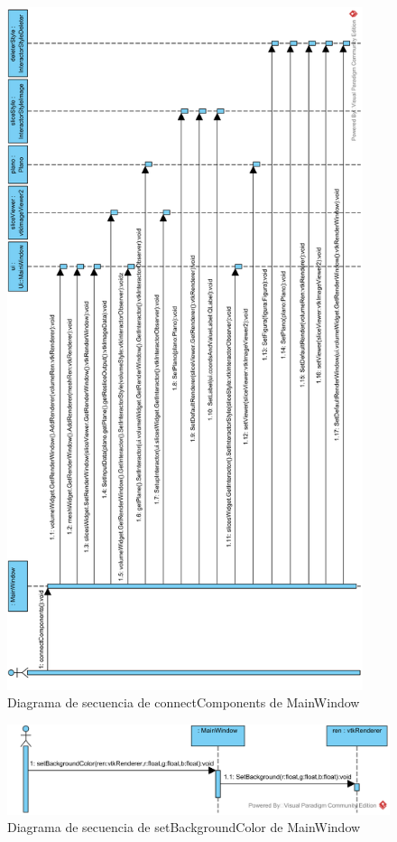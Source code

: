 \begin{figure}[H]
	\centering
	\includegraphics[height=20cm]{imagenes/diagramas/secuencia/MainWindow_ConnectComponents}
	\caption{Diagrama de secuencia de connectComponents de MainWindow}
	\label{fig:diagrama_secuencia_mainWindow_connectComponents}
\end{figure}

\begin{figure}[H]
	\centering
	\includegraphics[width=12cm]{imagenes/diagramas/secuencia/MainWindow_SetBackgroundColor}
	\caption{Diagrama de secuencia de setBackgroundColor de MainWindow}
	\label{fig:diagrama_secuencia_mainWindow_setBackgroundColor}
\end{figure}

